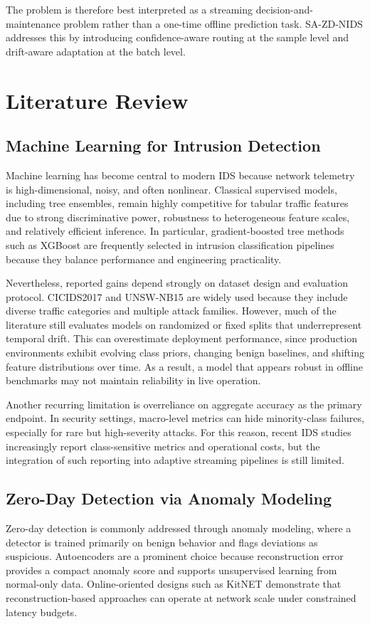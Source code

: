 \documentclass[conference]{IEEEtran}
\begin{document}
The problem is therefore best interpreted as a streaming decision-and-maintenance problem rather than a one-time offline prediction task. SA-ZD-NIDS addresses this by introducing confidence-aware routing at the sample level and drift-aware adaptation at the batch level.

\section{Literature Review}
\subsection{Machine Learning for Intrusion Detection}
Machine learning has become central to modern IDS because network telemetry is high-dimensional, noisy, and often nonlinear. Classical supervised models, including tree ensembles, remain highly competitive for tabular traffic features due to strong discriminative power, robustness to heterogeneous feature scales, and relatively efficient inference. In particular, gradient-boosted tree methods such as XGBoost \cite{chen2016xgboost} are frequently selected in intrusion classification pipelines because they balance performance and engineering practicality.

Nevertheless, reported gains depend strongly on dataset design and evaluation protocol. CICIDS2017 \cite{sharafaldin2018toward} and UNSW-NB15 \cite{moustafa2015unsw} are widely used because they include diverse traffic categories and multiple attack families. However, much of the literature still evaluates models on randomized or fixed splits that underrepresent temporal drift. This can overestimate deployment performance, since production environments exhibit evolving class priors, changing benign baselines, and shifting feature distributions over time. As a result, a model that appears robust in offline benchmarks may not maintain reliability in live operation.

Another recurring limitation is overreliance on aggregate accuracy as the primary endpoint. In security settings, macro-level metrics can hide minority-class failures, especially for rare but high-severity attacks. For this reason, recent IDS studies increasingly report class-sensitive metrics and operational costs, but the integration of such reporting into adaptive streaming pipelines is still limited.

\subsection{Zero-Day Detection via Anomaly Modeling}
Zero-day detection is commonly addressed through anomaly modeling, where a detector is trained primarily on benign behavior and flags deviations as suspicious. Autoencoders are a prominent choice because reconstruction error provides a compact anomaly score and supports unsupervised learning from normal-only data. Online-oriented designs such as KitNET \cite{mirsky2018kitsune} demonstrate that reconstruction-based approaches can operate at network scale under constrained latency budgets.
\end{document}
